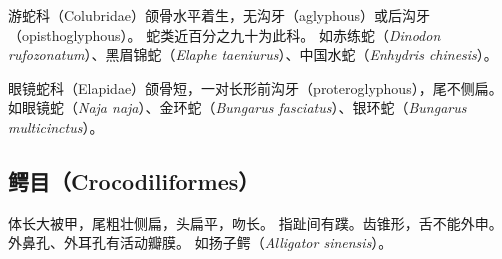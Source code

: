 \documentclass[11pt]{article}
\begin{document}
\newline

游蛇科（Colubridae）颌骨水平着生，无沟牙（aglyphous）或后沟牙（opisthoglyphous）。
蛇类近百分之九十为此科。
如赤练蛇（\textit{Dinodon rufozonatum}）、黑眉锦蛇（\textit{Elaphe taeniurus}）、中国水蛇（\textit{Enhydris chinesis}）。

\newline

眼镜蛇科（Elapidae）颌骨短，一对长形前沟牙（proteroglyphous），尾不侧扁。
如眼镜蛇（\textit{Naja naja}）、金环蛇（\textit{Bungarus fasciatus}）、银环蛇（\textit{Bungarus multicinctus}）。

\subsection{鳄目（Crocodiliformes）}
体长大被甲，尾粗壮侧扁，头扁平，吻长。
指趾间有蹼。齿锥形，舌不能外申。
外鼻孔、外耳孔有活动瓣膜。
如扬子鳄（\textit{Alligator sinensis}）。
\end{document}
